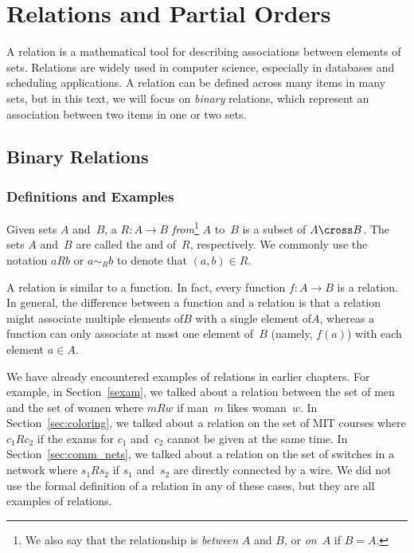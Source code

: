 \chapter{Relations and Partial Orders}\label{chap:partial_orders}

A relation is a mathematical tool for describing associations between
elements of sets.  Relations are widely used in computer science,
especially in databases and scheduling applications.  A relation can
be defined across many items in many sets, but in this text, we will
focus on \emph{binary} relations, which represent an association
between two items in one or two sets.

\section{Binary Relations}

\subsection{Definitions and Examples}

\begin{definition}\label{def:binary_relation}
Given sets $A$ and~$B$, a  $R: A \to B$
\emph{from}\footnote{We also say that the relationship is
  \emph{between} $A$ and $B$, or \emph{on}~$A$ if $B = A$.} $A$ to~$B$
is a subset of $A \cross B$.  The sets $A$ and~$B$ are called the
 and  of~$R$, respectively.  We commonly
use the notation $aRb$ or $a \sim_R b$ to denote that $(a, b) \in R$.
\end{definition}

A relation is similar to a function.  In fact, every function $f: A
\to B$ is a relation.  In general, the difference between a function
and a relation is that a relation might associate multiple elements
of$B$ with a single element of$A$, whereas a function can only
associate at most one element of~$B$ (namely, $f(a)$) with each
element $a \in A$.

We have already encountered examples of relations in earlier chapters.
For example, in Section~\ref{sexam}, we talked about a relation
between the set of men and the set of women where $mRw$ if man~$m$
likes woman~$w$.  In Section~\ref{sec:coloring}, we talked about a
relation on the set of MIT courses where $c_1 R c_2$ if the exams for
$c_1$ and~$c_2$ cannot be given at the same time.  In
Section~\ref{sec:comm_nets}, we talked about a relation on the set of
switches in a network where $s_1 R s_2$ if $s_1$ and~$s_2$ are
directly connected by a wire.  We did not use the formal definition of
a relation in any of these cases, but they are all examples of
relations.

